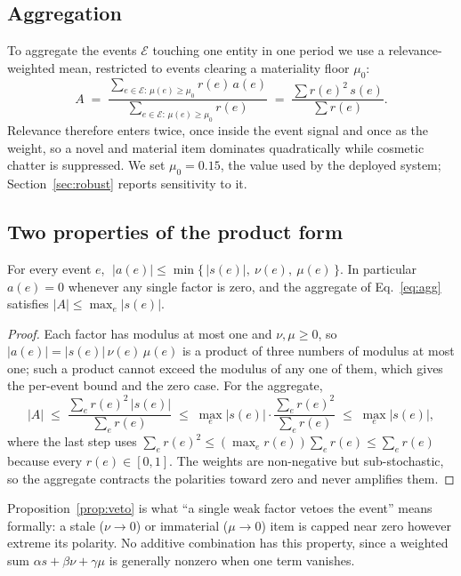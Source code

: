\subsection{Aggregation}

To aggregate the events $\mathcal{E}$ touching one entity in one period we use a
relevance-weighted mean, restricted to events clearing a materiality floor
$\mu_0$:
\begin{equation}\label{eq:agg}
A\;=\;\frac{\sum_{e\in\mathcal{E}:\,\mu(e)\ge\mu_0} r(e)\,a(e)}
           {\sum_{e\in\mathcal{E}:\,\mu(e)\ge\mu_0} r(e)}
 \;=\;\frac{\sum r(e)^2\,s(e)}{\sum r(e)}.
\end{equation}
Relevance therefore enters twice, once inside the event signal and once as the
weight, so a novel and material item dominates quadratically while cosmetic
chatter is suppressed. We set $\mu_0=0.15$, the value used by the deployed
system; Section~\ref{sec:robust} reports sensitivity to it.

\subsection{Two properties of the product form}

\begin{proposition}\label{prop:veto}
For every event $e$,
$\;|a(e)|\le\min\{\,|s(e)|,\ \nu(e),\ \mu(e)\,\}$.
In particular $a(e)=0$ whenever any single factor is zero, and the aggregate of
Eq.~\eqref{eq:agg} satisfies $|A|\le\max_{e}|s(e)|$.
\end{proposition}

\begin{proof}
Each factor has modulus at most one and $\nu,\mu\ge0$, so
$|a(e)|=|s(e)|\,\nu(e)\,\mu(e)$ is a product of three numbers of modulus at most
one; such a product cannot exceed the modulus of any one of them, which gives the
per-event bound and the zero case. For the aggregate,
\[
|A|\;\le\;\frac{\sum_e r(e)^2\,|s(e)|}{\sum_e r(e)}
   \;\le\;\max_e|s(e)|\cdot\frac{\sum_e r(e)^2}{\sum_e r(e)}
   \;\le\;\max_e|s(e)|,
\]
where the last step uses $\sum_e r(e)^2\le(\max_e r(e))\sum_e r(e)\le\sum_e r(e)$
because every $r(e)\in[0,1]$. The weights are non-negative but sub-stochastic, so
the aggregate contracts the polarities toward zero and never amplifies them.
\end{proof}

Proposition~\ref{prop:veto} is what ``a single weak factor vetoes the event''
means formally: a stale ($\nu\!\to\!0$) or immaterial ($\mu\!\to\!0$) item is
capped near zero however extreme its polarity. No additive combination has this
property, since a weighted sum $\alpha s+\beta\nu+\gamma\mu$ is generally nonzero
when one term vanishes.

